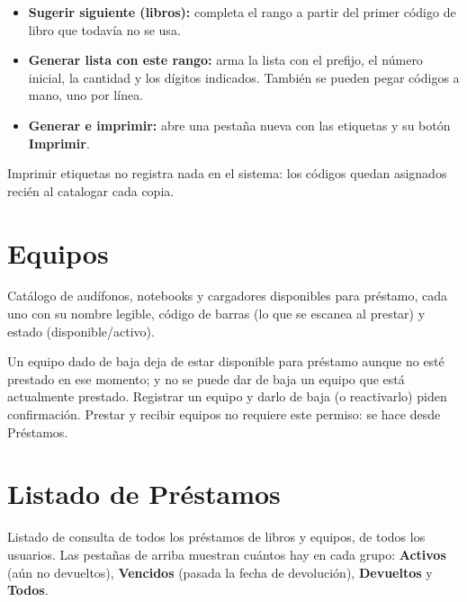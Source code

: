 \documentclass[11pt,a4paper]{report}
\begin{document}
\begin{itemize}
  \item \textbf{Sugerir siguiente (libros):} completa el rango a partir
  del primer código de libro que todavía no se usa.
  \item \textbf{Generar lista con este rango:} arma la lista con el
  prefijo, el número inicial, la cantidad y los dígitos indicados. También
  se pueden pegar códigos a mano, uno por línea.
  \item \textbf{Generar e imprimir:} abre una pestaña nueva con las
  etiquetas y su botón \textbf{Imprimir}.
\end{itemize}

\begin{nota}
Imprimir etiquetas no registra nada en el sistema: los códigos quedan
asignados recién al catalogar cada copia.
\end{nota}

\section{Equipos}


Catálogo de audífonos, notebooks y cargadores disponibles para préstamo,
cada uno con su nombre legible, código de barras (lo que se escanea al
prestar) y estado (disponible/activo).


Un equipo dado de baja deja de estar disponible para préstamo aunque no
esté prestado en ese momento; y no se puede dar de baja un equipo que
está actualmente prestado. Registrar un equipo y darlo de baja (o
reactivarlo) piden confirmación. Prestar y recibir equipos no requiere
este permiso: se hace desde Préstamos.

\section{Listado de Préstamos}


Listado de consulta de todos los préstamos de libros y equipos, de todos
los usuarios. Las pestañas de arriba muestran cuántos hay en cada grupo:
\textbf{Activos} (aún no devueltos), \textbf{Vencidos} (pasada la fecha de
devolución), \textbf{Devueltos} y \textbf{Todos}.

\end{document}
